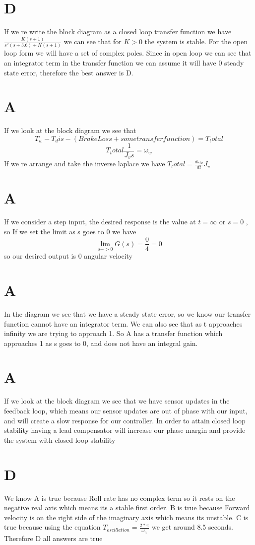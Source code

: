 \documentclass[11pt,english]{article}
\begin{document}
\section{D}
If we re write the block diagram as a  closed loop transfer function we have 
$\frac{K(s+1)}{s^2(s+3.6) + K(s+1)}$ we can see that for $ K > 0 $ the system is stable. For the open loop form we will have a set of complex poles.
Since in open loop we can see that an integrator term in the transfer function we can assume it will have 0 steady state error, therefore the best answer is D. 
\section{A}
If we look at the block diagram we see that 
$$ T_w - T_dis - (Brake Loss + some transfer function) = T_total$$ 
$$ T_total\frac{1}{J_vs} =\omega_w $$
If we re arrange and take the inverse laplace we have 
$T_total = \frac{d\omega_w}{dt}  J_v $  
\section{A}
If we consider a step input, the desired response is the value at $t = \infty$ or $s = 0$ , so If we set the limit as s goes to 0 we have
$$\lim_{s->0} G(s) =  \frac{0}{4} = 0 $$ 
so our desired output is 0 angular velocity 

\section{A}
In the diagram we see that we have a steady state error, so we know our transfer function cannot have an integrator term. We can also see that as t approaches infinity we are trying to approach 1. So A has a transfer function which approaches 1 as s goes to 0, and does not have an integral gain.  
\section{A}
If we look at the block diagram we see that we have sensor updates in the feedback loop, which means our sensor updates are out of phase with our input, and will create a slow response for our controller. In order to attain closed loop stability having a lead compensator will increase our phase margin and provide the system with closed loop stability 
\section{D}
We know A is true because Roll rate has no complex term so it rests on the negative real axis which means its a stable first order. B is true because Forward velocity is on the right side of the imaginary axis which means its unstable. C is true because using the equation $ T_{oscillation} = \frac{2*\pi}{\omega_{n} }$  we get around 8.5 seconds. Therefore D all answers are true 
\end{document}
